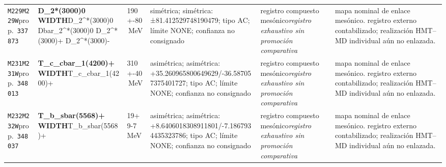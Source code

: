 \begin{landscape}
\begin{longtable}{L{1.85cm}L{4.45cm}L{2.35cm}L{4.05cm}L{3.35cm}L{7.15cm}}
\texttt{M229}\newline \texttt{M229W}\newline prop.\ \texttt{337873} & \textbf{D\_\allowbreak{}2*(3000)0 WIDTH}\newline D\_\allowbreak{}2\textasciicircum{}*(3000)0 \textbar{}\allowbreak{} Dbar\_\allowbreak{}2\textasciicircum{}*(3000)0 \textbar{}\allowbreak{} D\_\allowbreak{}2\textasciicircum{}*(3000)+ \textbar{}\allowbreak{} D\_\allowbreak{}2\textasciicircum{}*(3000)- & 190+-80\,MeV & simétrica; simétrica: ±81.412529748190479; tipo AC; límite NONE; confianza no consignado & registro compuesto mesónico\newline \emph{registro exhaustivo sin promoción comparativa} & mapa nominal de enlace mesónico. registro externo contabilizado; realización HMT--MD individual aún no enlazada. \\
\texttt{M231}\newline \texttt{M231W}\newline prop.\ \texttt{348013} & \textbf{T\_\allowbreak{}c\_\allowbreak{}cbar\_\allowbreak{}1(4200)+ WIDTH}\newline T\_\allowbreak{}c\_\allowbreak{}cbar\_\allowbreak{}1(4200)+ & 310+-40\,MeV & asimétrica; asimétrica: +35.260965800649629/-36.587057375401727; tipo AC; límite NONE; confianza no consignado & registro compuesto mesónico\newline \emph{registro exhaustivo sin promoción comparativa} & mapa nominal de enlace mesónico. registro externo contabilizado; realización HMT--MD individual aún no enlazada. \\
\texttt{M232}\newline \texttt{M232W}\newline prop.\ \texttt{348037} & \textbf{T\_\allowbreak{}b\_\allowbreak{}sbar(5568)+ WIDTH}\newline T\_\allowbreak{}b\_\allowbreak{}sbar(5568)+ & 19+9-7\,MeV & asimétrica; asimétrica: +8.6406018308911801/-7.1867934435323786; tipo AC; límite NONE; confianza no consignado & registro compuesto mesónico\newline \emph{registro exhaustivo sin promoción comparativa} & mapa nominal de enlace mesónico. registro externo contabilizado; realización HMT--MD individual aún no enlazada. \\

\end{longtable}
\end{landscape}
